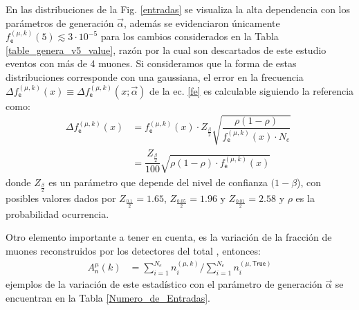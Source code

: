 En las distribuciones de la Fig. \ref{entradas} se visualiza la alta dependencia con los parámetros de generación $\vec{\alpha}$, además se evidenciaron únicamente $f^{(\mu, k)}_\textsf{e}(5)\lesssim 3\cdot 10^{-5}$ para los cambios considerados en la Tabla  \ref{table_genera_v5_value}, razón por la cual son descartados de este estudio eventos con más de 4 muones. Si consideramos que la forma de estas distribuciones corresponde con una gaussiana, el error en la frecuencia $\Delta f^{(\mu, k)}_\textsf{e} (x) \equiv \Delta f^{(\mu, k)}_\textsf{e} (x;\vec{\alpha})$ de la ec. \ref{fe} es calculable siguiendo la referencia \cite{muestra_1} como:
\begin{eqnarray}\label{error0}
\Delta f^{(\mu, k)}_\textsf{e} (x) & = f^{(\mu, k)}_\textsf{e} (x) \cdot Z_{\frac{\beta}{2}} \sqrt{\dfrac{\rho(1-\rho)}{f^{(\mu, k)}_\textsf{e} (x)\cdot N_e}} \\
& = \dfrac{Z_{\frac{\beta}{2}}}{100} \sqrt{\rho(1-\rho)\cdot f^{(\mu, k)}_\textsf{e} (x)} ~~~~~~~~~~~
\end{eqnarray}%
donde $Z_{\frac{\beta}{2}}$ es un parámetro que depende del nivel de confianza $(1-\beta$), con posibles valores dados por $Z_{\frac{0.1}{2}}=1.65$, $Z_{\frac{0.05}{2}}=1.96$ y $Z_{\frac{0.01}{2}}=2.58$ y $\rho$ es la probabilidad ocurrencia.

Otro elemento importante a tener en cuenta, es la variación de la fracción de muones reconstruidos por los detectores del total \MC, entonces:
\begin{eqnarray}\label{Ak}
A_\textsf{n}^\mu(k) & = {\sum\limits_{i=1}^{N_e} n_i^{(\mu,k)}}/{\sum\limits_{i=1}^{N_e} n_i^{(\mu,\textsf{True})}}
\end{eqnarray}
ejemplos de la variación de este estadístico con el parámetro de generación $\vec{\alpha}$ se encuentran en la Tabla \ref{Numero_de_Entradas}.



